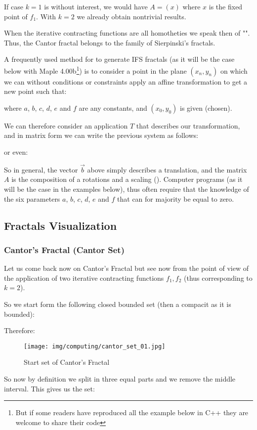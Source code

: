 	If case $k=1$ is without interest, we would have $A=(x)$ where $x$ is the fixed point of $f_1$. With $k=2$ we already obtain nontrivial results.
	\begin{tcolorbox}[title=Remark,colframe=black,arc=10pt]
	When the iterative contracting functions are all homotheties we speak then of "". Thus, the Cantor fractal  belongs to the family of Sierpinski's fractals.
	\end{tcolorbox}
	A frequently used method for to generate IFS fractals (as it will be the case below with Maple 4.00b\footnote{But if some readers have reproduced all the example below in C++ they are welcome to share their code}) is to consider a point in the plane $(x_n,y_n)$ on which we can without conditions or constraints apply an affine transformation to get a new point such that:
	
	where $a$, $b$, $c$, $d$, $e$ and $f$ are any constants, and $(x_0,y_0)$ is given (chosen).
	
	We can therefore consider an application $T$ that describes our transformation, and in matrix form we can write the previous system as follows:
	
	or even:
	
	So in general, the vector $\vec{b}$ above simply describes a translation, and the matrix $A$ is the composition of a rotations and a scaling (). Computer programs (as it will be the case in the examples below), thus often require that the knowledge of the six parameters $a$, $b$, $c$, $d$, $e$ and $f$ that can for majority be equal to zero.
	
	\pagebreak
	\subsection{Fractals Visualization}
	
	\subsubsection{Cantor's Fractal (Cantor Set)}
	Let us come back now on Cantor's Fractal but see now from the point of view of the application of two iterative contracting functions $f_1,f_2$ (thus corresponding to $k = 2$).

	So we start form the following closed bounded set (then a compacit as it is bounded):
	
	Therefore: 
	\begin{figure}[H]
		\centering
		\texttt{[image: img/computing/cantor\_set\_01.jpg]}
		\caption[]{Start set of Cantor's Fractal}
	\end{figure}
	So now by definition we split in three equal parts and we remove the middle interval. This gives us the set:
	
